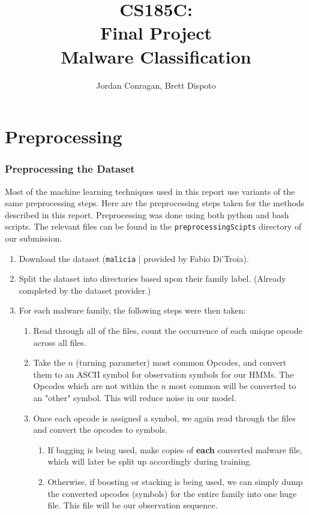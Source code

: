 \documentclass[12pt]{article}
\title{CS185C: \\ 
Final Project \\
Malware Classification}
\author{Jordan Conragan,  Brett Dispoto}
\begin{document}
\maketitle
\tableofcontents
\newpage

\part{Preprocessing}
\section{Preprocessing the Dataset}
Most of the machine learning techniques used in this report use variants of the same preprocessing steps. Here are the preprocessing steps taken for the methods described in this report. Preprocessing was done using both python and bash scripts. The relevant files can be found in the \texttt{preprocessingScipts} directory of our submission.
  \begin{enumerate}
  \item Download the dataset (\texttt{malicia} | provided by Fabio Di'Troia).
    \item Split the dataset into directories based upon their family label. (Already completed by the dataset provider.)
    \item For each malware family, the following steps were then taken:
      \begin{enumerate}
        \item Read through all of the files, count the occurrence of each unique opcode across all files.
        \item Take the $n$ (turning parameter) most common Opcodes, and convert them to an ASCII symbol for observation symbols for our HMMs. The Opcodes which are not within the $n$ most common will be converted to an "other" symbol. This will reduce noise in our model.
        \item Once each opcode is assigned a symbol, we again read through the files and convert the opcodes to symbols.

        \begin{enumerate}
          \item If bagging is being used, make copies of \textbf{each} converted malware file, which will later be split up accordingly during training.
          \item Otherwise, if boosting or stacking is being used, we can simply dump the converted opcodes (symbols) for the entire family into one huge file. This file will be our observation sequence.
        \end{enumerate}
      \end{enumerate}
  \end{enumerate}
\newpage
\end{document}
